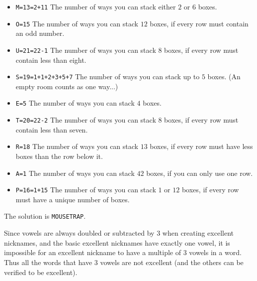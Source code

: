 \begin{multicols}{2}
  \begin{itemize}
    \item \texttt{M=13=2+11}
      The number of ways you can stack either \(2\) or \(6\) boxes.
    \item \texttt{O=15}
      The number of ways you can stack \(12\) boxes, if every row must
      contain an odd number.
    \item \texttt{U=21=22-1}
      The number of ways you can stack \(8\) boxes, if every row must contain
      less than eight.
    \item \texttt{S=19=1+1+2+3+5+7}
      The number of ways you can stack up to \(5\) boxes. (An empty room
      counts as one way...)
    \item \texttt{E=5}
      The number of ways you can stack \(4\) boxes.
  \end{itemize}
\columnbreak
  \begin{itemize}
    \item \texttt{T=20=22-2}
      The number of ways you can stack \(8\) boxes, if every row must contain
      less than seven.
    \item \texttt{R=18}
      The number of ways you can stack \(13\) boxes, if every row must have
      less boxes than the row below it.
    \item \texttt{A=1}
      The number of ways you can stack \(42\) boxes, if you can only use one
      row.
    \item \texttt{P=16=1+15}
      The number of ways you can stack \(1\) or \(12\) boxes, if every row must
      have a unique number of boxes.
  \end{itemize}
\end{multicols}

The solution is \texttt{MOUSETRAP}.


Since vowels are always doubled or subtracted by \(3\) when creating
excellent nicknames, and the basic excellent nicknames
have exactly one vowel, it is impossible for an excellent nickname
to have a multiple of \(3\) vowels in a word.
Thus all the words that have \(3\) vowels are not excellent (and the
others can be verified to be excellent).

